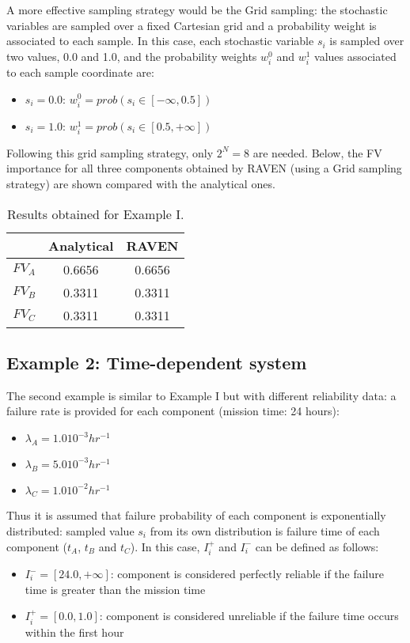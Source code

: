 A more effective sampling strategy would be the Grid sampling: the stochastic variables 
are sampled over a fixed Cartesian grid and a probability weight is associated to each sample. 
In this case, each stochastic variable $s_i$ is sampled over two values, 0.0 and 1.0, and the 
probability weights $w_i^0$ and $w_i^1$ values associated to each sample coordinate are:
\begin{itemize}
  \item $s_i=0.0$: $w_i^0=prob(s_i \in [-\infty,0.5])$
  \item $s_i=1.0$: $w_i^1=prob(s_i \in [0.5,+\infty])$
\end{itemize}
Following this grid sampling strategy, only $2^N=8$ are needed.
Below, the FV importance for all three components obtained by RAVEN (using a Grid sampling 
strategy) are shown compared with the analytical ones.

\begin{table}
  \caption{Results obtained for Example I.} 
  \centering 
  \begin{tabular}{c | c | c } 
    \hline 
     & Analytical & RAVEN \\ 
    \hline 
    $FV_A$ & 0.6656 & 0.6656   \\
    $FV_B$ & 0.3311 & 0.3311   \\
    $FV_C$ & 0.3311 & 0.3311   \\
    \hline 
  \end{tabular}
  \label{tab:example1} 
\end{table}

\subsection{Example 2: Time-dependent system}
\label{sec:example2}

The second example is similar to Example I but with different reliability data: 
a failure rate is provided for each component (mission time: 24 hours): 
\begin{itemize}
  \item $\lambda_A = 1.0 10^{-3} hr^{-1}$
  \item $\lambda_B = 5.0 10^{-3} hr^{-1}$
  \item $\lambda_C = 1.0 10^{-2} hr^{-1}$
\end{itemize}
Thus it is assumed that failure probability of each component is exponentially 
distributed: sampled value $s_i$ from its own distribution is failure time of each 
component ($t_A$, $t_B$ and $t_C$).
In this case, $I_i^+$ and $I_i^-$ can be defined as follows:
\begin{itemize}
  \item $I_i^-=[24.0,+\infty]$: component is considered perfectly reliable if the failure 
        time is greater than the mission time
  \item $I_i^+=[0.0,1.0]$: component is considered unreliable if the failure time 
        occurs within the first hour
\end{itemize}

